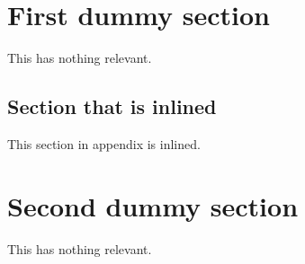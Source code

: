 \documentclass{article}
\begin{document}
\section{First dummy section}
This has nothing relevant.

\begin{toappendix}
\section{Section that is inlined}
This section in appendix is inlined.
\end{toappendix}

\section{Second dummy section}
This has nothing relevant.

\begin{toappendix}

\end{toappendix}
\end{document}
